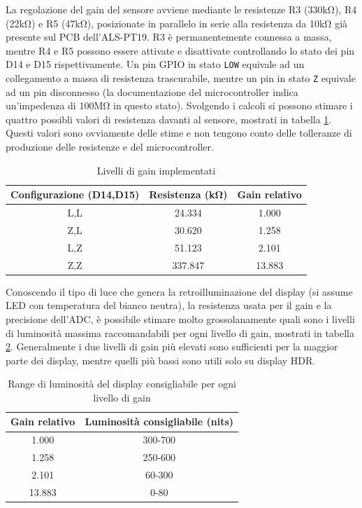 La regolazione del gain del sensore avviene mediante le resistenze R3 (330k\si{\ohm}), R4 (22k\si{\ohm}) e R5 (47k\si{\ohm}), posizionate in parallelo in serie alla resistenza da 10k\si{\ohm} già presente sul PCB dell'ALS-PT19. R3 è permanentemente connessa a massa, mentre R4 e R5 possono essere attivate e disattivate controllando lo stato dei pin D14 e D15 rispettivamente. Un pin GPIO in stato \texttt{LOW} equivale ad un collegamento a massa di resistenza trascurabile, mentre un pin in stato \texttt{Z} equivale ad un pin disconnesso (la documentazione del microcontroller indica un'impedenza di 100M\si{\ohm} in questo stato). Svolgendo i calcoli si possono stimare i quattro possibli valori di resistenza davanti al sensore, mostrati in tabella \ref{tab:pt19_gains}. Questi valori sono ovviamente delle stime e non tengono conto delle tolleranze di produzione delle resistenze e del microcontroller.
\begin{table}
	\centering
	\begin{tabular}{|c|c|c|} 
		\hline
		\textbf{Configurazione (D14,D15)} & \textbf{Resistenza (k\si{\ohm})} & \textbf{Gain relativo}  \\ 
		\hline
		L,L & 24.334   & 1.000         \\ 
		\hline
		Z,L & 30.620   & 1.258         \\ 
		\hline
		L,Z & 51.123   & 2.101         \\ 
		\hline
		Z,Z & 337.847    & 13.883          \\
		\hline
	\end{tabular}
	\caption{\label{tab:pt19_gains}Livelli di gain implementati}
\end{table}

Conoscendo il tipo di luce che genera la retroilluminazione del display (si assume LED con temperatura del bianco neutra), la resistenza usata per il gain e la precisione dell'ADC, è possibile stimare molto grossolanamente quali sono i livelli di luminosità massima raccomandabili per ogni livello di gain, mostrati in tabella \ref{tab:pt19_nits}. Generalmente i due livelli di gain più elevati sono sufficienti per la maggior parte dei display, mentre quelli più bassi sono utili solo su display HDR.
\begin{table}
	\centering
	\begin{tabular}{|c|c|} 
		\hline
		\textbf{Gain relativo} & \textbf{Luminosità consigliabile (nits)}  \\ 
		\hline
		1.000 & 300-700         \\ 
		\hline
		1.258 & 250-600         \\ 
		\hline
		2.101 & 60-300         \\ 
		\hline
		13.883 & 0-80          \\
		\hline
	\end{tabular}
	\caption{\label{tab:pt19_nits}Range di luminosità del display consigliabile per ogni livello di gain}
\end{table}

